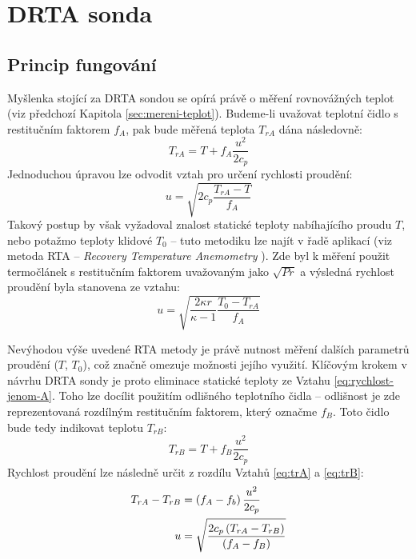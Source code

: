 \section{DRTA sonda}
    \subsection{Princip fungování} \label{sec:DRTA-princip}
        Myšlenka stojící za DRTA sondou se opírá právě o měření rovnovážných teplot (viz předchozí Kapitola \ref{sec:mereni-teplot}). Budeme-li uvažovat teplotní čidlo s restitučním faktorem $f_A$, pak bude měřená teplota $T_{rA}$ dána následovně:
        \begin{equation} \label{eq:trA}
            T_{rA} = T + f_A \frac{u^2}{2 c_p}
        \end{equation}
        \noindent Jednoduchou úpravou lze odvodit vztah pro určení rychlosti proudění:
        \begin{equation} \label{eq:rychlost-jenom-A}
            u = \sqrt{2 c_p \frac{T_{rA} - T}{f_A}}
        \end{equation}
        Takový postup by však vyžadoval znalost statické teploty nabíhajícího proudu $T$, nebo potažmo teploty klidové $T_0$ – tuto metodiku lze najít v řadě aplikací (viz metoda RTA – \textit{Recovery Temperature Anemometry} \cite{Ishibashi2004, Ishibashi2012}). Zde byl k měření použit termočlánek \linebreak s restitučním faktorem uvažovaným jako $\sqrt{Pr}$ a výsledná rychlost proudění byla stanovena ze vztahu:
        \begin{equation}
            u = \sqrt{\frac{2 \kappa r}{\kappa - 1} \frac{T_0 - T_{rA}}{f_A}}
        \end{equation}
        
        Nevýhodou výše uvedené RTA metody je právě nutnost měření dalších parametrů proudění ($T$, $T_0$), což značně omezuje možnosti jejího využití. Klíčovým krokem v\,návrhu DRTA sondy je proto eliminace statické teploty ze Vztahu \ref{eq:rychlost-jenom-A}. Toho lze docílit použitím odlišného teplotního čidla – odlišnost je zde reprezentovaná rozdílným restitučním faktorem, který označme $f_B$. Toto čidlo bude tedy indikovat teplotu $T_{rB}$:
        \begin{equation} \label{eq:trB}
            T_{rB} = T + f_B \frac{u^2}{2 c_p}
        \end{equation}
        \noindent Rychlost proudění lze následně určit z rozdílu Vztahů \ref{eq:trA} a \ref{eq:trB}:
        \begin{align} \label{eq:mereni-rychlosti}
                T_{rA} - T_{rB} &= \left( f_A - f_b \right) \frac{u^2}{2 c_p} \\
                u &= \sqrt{\frac{2 c_p \left( T_{rA} - T_{rB} \right)}{\left( f_A - f_B \right)}}
        \end{align}

